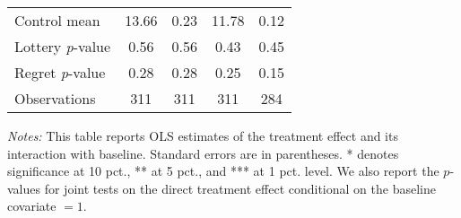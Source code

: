 \begin{table}[htbp]
{\begin{threeparttable}
\begin{tabular}{l*{4}{c}}
Control mean    &    13.66         &     0.23         &    11.78         &     0.12         \\
Lottery \emph{p}-value&     0.56         &     0.56         &     0.43         &     0.45         \\
Regret \emph{p}-value&     0.28         &     0.28         &     0.25         &     0.15         \\
Observations    &      311         &      311         &      311         &      284         \\
\bottomrule \end{tabular} \begin{tablenotes}[flushleft] \footnotesize \item \emph{Notes:} This table reports OLS estimates of the treatment effect and its interaction with baseline. Standard errors are in parentheses. * denotes significance at 10 pct., ** at 5 pct., and *** at 1 pct. level. We also report the \(p\)-values for joint tests on the direct treatment effect conditional on the baseline covariate $= 1$. \end{tablenotes} \end{threeparttable} } \end{table}

